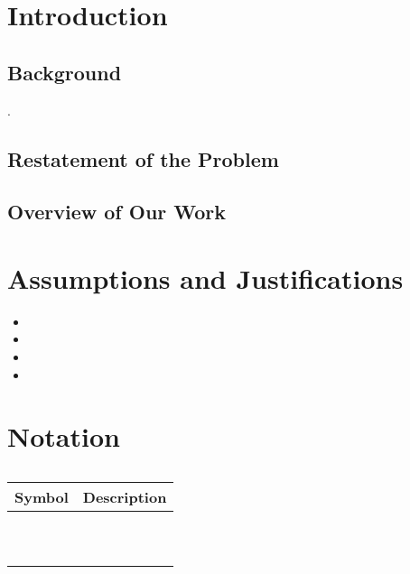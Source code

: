 \documentclass{mcmthesis}
\begin{document}
\section{Introduction}
\subsection{Background}

.
\subsection{Restatement of the Problem}%


\subsection{Overview of Our Work}%




\section{Assumptions and Justifications}
\begin{itemize}
\item
\item
\item
\item
\end{itemize}


\section{Notation}%
\begin{center}
	\begin{longtable}{cl}
		\caption{    }\\ %
		\hline
		Symbol& Description  \\
		\hline
		$   $   &
		\\
		$   $   &
		\\
		$   $   &
		\\
		$   $   &
		\\
		$   $   &
		\\
		$   $   &
		\\
		$   $   &
		\\
		$   $   &
		\\
		$   $   &
		\\
		$   $   &
		\\
		
	\end{longtable}
\end{center}
\end{document}
